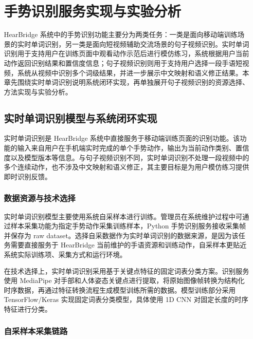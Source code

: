 \chapter{手势识别服务实现与实验分析}


\setlength{\tabcolsep}{3pt}
HearBridge 系统中的手势识别功能主要分为两类任务：一类是面向移动端训练场景的实时单词识别，另一类是面向短视频辅助交流场景的句子视频识别。实时单词识别用于支持用户在训练页面中观看动作示范后进行模仿练习，系统根据用户当前动作返回识别结果和置信度信息；句子视频识别则用于支持用户选择一段手语短视频，系统从视频中识别多个词级结果，并进一步展示中文映射和语义修正结果。本章先围绕实时单词识别说明系统闭环实现，再单独展开句子视频识别的资源选择、方法实现与实验分析。

\section{实时单词识别模型与系统闭环实现}

实时单词识别是 HearBridge 系统中直接服务于移动端训练页面的识别功能。该功能的输入来自用户在手机端实时完成的单个手势动作，输出为当前动作类别、置信度以及模型版本等信息。与句子视频识别不同，实时单词识别不处理一段视频中的多个连续动作，也不涉及中文映射和语义修正，其主要目标是为用户模仿练习提供即时识别反馈。

\subsection{数据资源与技术选择}

实时单词识别模型主要使用系统自采样本进行训练。管理员在系统维护过程中可通过样本采集功能为指定手势动作采集训练样本，Python 手势识别服务接收采集帧并保存为 raw dataset。选择自采数据作为实时单词识别的数据来源，是因为该任务需要直接服务于 HearBridge 当前维护的手语资源和训练动作，自采样本更贴近系统实际训练项、采集方式和运行环境。

在技术选择上，实时单词识别采用基于关键点特征的固定词表分类方案。识别服务使用 MediaPipe 对手部和人体姿态关键点进行提取，将原始图像帧转换为结构化时序数据，再通过特征转换流程生成模型训练所需的数据。模型训练部分采用 TensorFlow/Keras 实现固定词表分类模型，具体使用 1D CNN 对固定长度的时序特征进行分类。

\subsection{自采样本采集链路}




